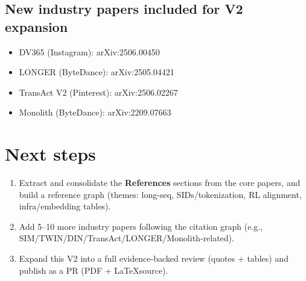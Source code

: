 \documentclass[11pt]{article}
\begin{document}
\subsection*{New industry papers included for V2 expansion}
\begin{itemize}
  \item DV365 (Instagram): arXiv:2506.00450
  \item LONGER (ByteDance): arXiv:2505.04421
  \item TransAct V2 (Pinterest): arXiv:2506.02267
  \item Monolith (ByteDance): arXiv:2209.07663
\end{itemize}

\section{Next steps}
\begin{enumerate}
  \item Extract and consolidate the \textbf{References} sections from the core papers, and build a reference graph (themes: long-seq, SIDs/tokenization, RL alignment, infra/embedding tables).
  \item Add 5--10 more industry papers following the citation graph (e.g., SIM/TWIN/DIN/TransAct/LONGER/Monolith-related).
  \item Expand this V2 into a full evidence-backed review (quotes + tables) and publish as a PR (PDF + \LaTeX source).
\end{enumerate}
\end{document}
